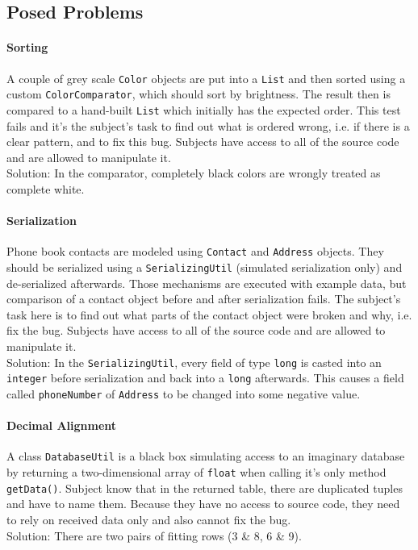 \documentclass[english]{acm_proc_article-sp}
\begin{document}
\subsection{Posed Problems}
\paragraph{Sorting}
A couple of grey scale \verb.Color. objects are put into a \verb.List. and then sorted using a custom \verb.ColorComparator., which should sort by brightness. The result then is compared to a hand-built \verb.List. which initially has the expected order. This test fails and it's the subject's task to find out what is ordered wrong, i.e. if there is a clear pattern, and to fix this bug. Subjects have access to all of the source code and are allowed to manipulate it.\\
Solution: In the comparator, completely black colors are wrongly treated as complete white.

\paragraph{Serialization}
Phone book contacts are modeled using \verb.Contact. and \verb.Address. objects. They should be serialized using a \verb.SerializingUtil. (simulated serialization only) and de-serialized afterwards.
Those mechanisms are executed with example data, but comparison of a contact object before and after serialization fails. The subject's task here is to find out what parts of the contact object were broken and why, i.e. fix the bug. Subjects have access to all of the source code and are allowed to manipulate it.\\
Solution: In the \verb.SerializingUtil., every field of type \verb.long. is casted into an \verb.integer. before serialization and back into a \verb.long. afterwards. This causes a field called \verb.phoneNumber. of \verb.Address. to be changed into some negative value.

\paragraph{Decimal Alignment}
A class \verb.DatabaseUtil. is a black box simulating access to an imaginary database by returning a two-dimensional array of \verb.float. when calling it's only method \verb.getData().. Subject know that in the returned table, there are duplicated tuples and have to name them. Because they have no access to source code, they need to rely on received data only and also cannot fix the bug.\\
Solution: There are two pairs of fitting rows (3 \& 8, 6 \& 9).
\end{document}
